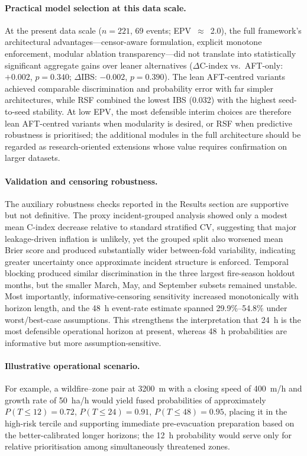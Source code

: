 \documentclass[fire,article,submit,pdftex]{../Definitions/mdpi}
\begin{document}
\paragraph{Practical model selection at this data scale.}
At the present data scale ($n = 221$, 69 events; EPV~$\approx$~2.0), the full framework's architectural advantages---censor-aware formulation, explicit monotone enforcement, modular ablation transparency---did not translate into statistically significant aggregate gains over leaner alternatives ($\Delta$C-index vs.\ AFT-only: $+0.002$, $p = 0.340$; $\Delta$IBS: $-0.002$, $p = 0.390$).
The lean AFT-centred variants achieved comparable discrimination and probability error with far simpler architectures, while RSF combined the lowest IBS (0.032) with the highest seed-to-seed stability.
At low EPV, the most defensible interim choices are therefore lean AFT-centred variants when modularity is desired, or RSF when predictive robustness is prioritised; the additional modules in the full architecture should be regarded as research-oriented extensions whose value requires confirmation on larger datasets.

\paragraph{Validation and censoring robustness.}
The auxiliary robustness checks reported in the Results section are supportive but not definitive.
The proxy incident-grouped analysis showed only a modest mean C-index decrease relative to standard stratified CV, suggesting that major leakage-driven inflation is unlikely, yet the grouped split also worsened mean Brier score and produced substantially wider between-fold variability, indicating greater uncertainty once approximate incident structure is enforced.
Temporal blocking produced similar discrimination in the three largest fire-season holdout months, but the smaller March, May, and September subsets remained unstable.
Most importantly, informative-censoring sensitivity increased monotonically with horizon length, and the 48~h event-rate estimate spanned 29.9\%--54.8\% under worst/best-case assumptions.
This strengthens the interpretation that 24~h is the most defensible operational horizon at present, whereas 48~h probabilities are informative but more assumption-sensitive.

\paragraph{Illustrative operational scenario.}
For example, a wildfire--zone pair at 3200~m with a closing speed of 400~m/h and growth rate of 50~ha/h would yield fused probabilities of approximately $P(T \leq 12) = 0.72$, $P(T \leq 24) = 0.91$, $P(T \leq 48) = 0.95$, placing it in the high-risk tercile and supporting immediate pre-evacuation preparation based on the better-calibrated longer horizons; the 12~h probability would serve only for relative prioritisation among simultaneously threatened zones.
\end{document}
